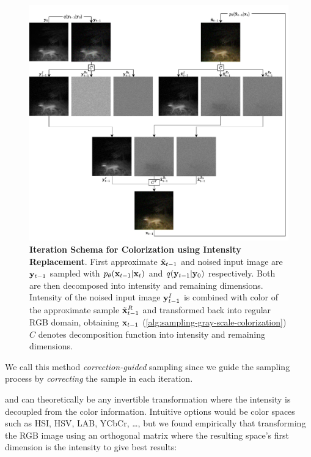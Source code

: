 \begin{figure}
   \includegraphics[width=\textwidth]{gfx/Gray-Scale-Colorization-Sampling.pdf}
   \caption{
      \textbf{Iteration Schema for Colorization using Intensity Replacement}.
      First approximate $\tilde{\mathbf{x}}_{t-1}$ and noised input image are $\mathbf{y}_{t-1}$ sampled with $p_\theta(\mathbf{x}_{t-1}|\mathbf{x}_t)$ and $q(\mathbf{y}_{t-1}|\mathbf{y}_0)$ respectively.
      Both are then decomposed into intensity and remaining dimensions. 
      Intensity of the noised input image $\mathbf{y}_{t-1}^I$ is combined with color of the approximate sample $\tilde{\mathbf{x}}_{t-1}^R$ and transformed back into regular RGB domain, obtaining $\mathbf{x}_{t-1}$ (\autoref{alg:sampling-gray-scale-colorization})
      $C$ denotes decomposition function into intensity and remaining dimensions.
   }
   \label{fig:sampling-gray-scale-colorization}
\end{figure}

We call this method \textit{correction-guided} sampling since we guide the sampling process by \textit{correcting} the sample in each iteration.

 and  can theoretically be any invertible transformation where the intensity is decoupled from the color information.
Intuitive options would be color spaces such as HSI, HSV, LAB, YCbCr, \dots,
but we found empirically that transforming the RGB image using an orthogonal matrix where the resulting space's first dimension is the intensity to give best results:

